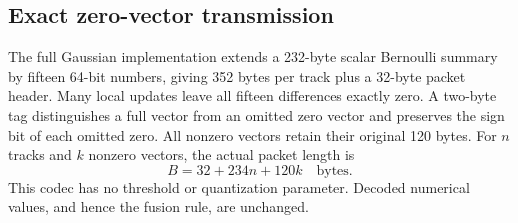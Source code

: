 \subsection{Exact zero-vector transmission}
The full Gaussian implementation extends a 232-byte scalar Bernoulli
summary by fifteen 64-bit numbers, giving 352 bytes per track plus a
32-byte packet header. Many local updates leave all fifteen differences
exactly zero. A two-byte tag distinguishes a full vector from an omitted
zero vector and preserves the sign bit of each omitted zero. All nonzero
vectors retain their original 120 bytes. For $n$ tracks and $k$ nonzero
vectors, the actual packet length is
\begin{equation}
 B=32+234n+120k\quad\text{bytes}.
 \label{eq:packet}
\end{equation}
This codec has no threshold or quantization parameter. Decoded numerical
values, and hence the fusion rule, are unchanged.
